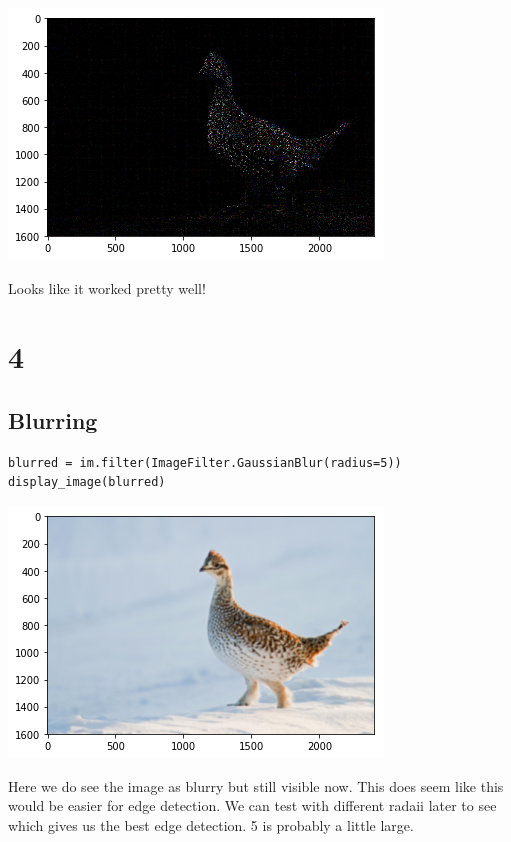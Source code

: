\documentclass[11pt]{article}
\begin{document}
\includegraphics[width=.9\linewidth]{./obipy-resources/333xd0.png}

Looks like it worked pretty well! 

\section*{4}
\label{sec-4}
\subsection*{Blurring}
\label{sec-4-1}

\begin{verbatim}
blurred = im.filter(ImageFilter.GaussianBlur(radius=5))
display_image(blurred)
\end{verbatim}
\includegraphics[width=.9\linewidth]{./obipy-resources/333jnD.png}

Here we do see the image as blurry but still visible now. This does seem like
this would be easier for edge detection. We can test with different radaii
later to see which gives us the best edge detection. 5 is probably a little
large.
\end{document}
